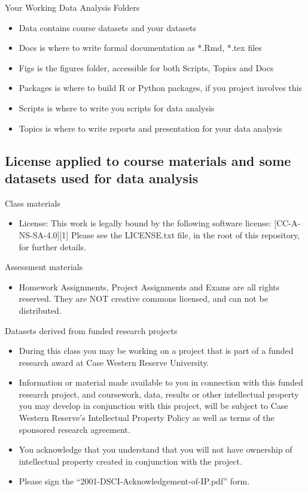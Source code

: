 \documentclass[11pt]{article} %
\begin{document}
    Your Working Data Analysis Folders
      \begin{itemize}
        \item Data contains course datasets and your datasets
        \item Docs is where to write formal documentation as *.Rmd, *.tex files
        \item Figs is the figures folder, accessible for both Scripts, Topics and Docs
        \item Packages is where to build R or Python packages, if you project involves this
        \item Scripts is where to write you scripts for data analysis
        \item Topics is where to write reports and presentation for your data analysis
      \end{itemize}
  
  \subsection{License applied to course materials and some datasets used for data analysis}
  
    Class materials
      \begin{itemize}
        \item License: This work is legally bound by the following software license: [CC-A-NS-SA-4.0][1]  
        \subitem Please see the LICENSE.txt file, in the root of this repository, for further details.
      \end{itemize}
    
    Assessment materials
      \begin{itemize}
        \item Homework Assignments, Project Assignments and Exams are all rights reserved. 
        \subitem They are NOT creative commons licensed, and can not be distributed. 
      \end{itemize}
    
    Datasets derived from funded research projects
      \begin{itemize}
        \item During this class you may be working on a project that is part of a funded research award at Case Western Reserve University.  
        \item Information or material made available to you in connection with this funded research project, and coursework, data, results or other intellectual property you may develop in conjunction with this project, will be subject to Case Western Reserve’s Intellectual Property Policy as well as terms of the sponsored research agreement.  
        \item You acknowledge that you understand that you will not have ownership of intellectual property created in conjunction with the project.
        \item Please sign the ``2001-DSCI-Acknowledgement-of-IP.pdf'' form. 
      \end{itemize}
    
\end{document}
